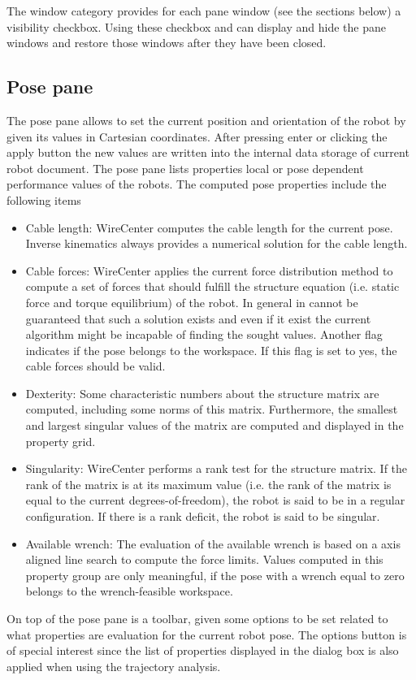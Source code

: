 \documentclass[11pt,a4paper,onepage,openany]{book}
\begin{document}
The window category provides for each pane  window (see the sections below) a
visibility checkbox. Using these checkbox and can display and hide the pane windows
and restore those windows after they have been closed.

\subsection{Pose pane}%
The pose pane allows to set the current position and orientation of the robot
by given its values in Cartesian coordinates. After pressing enter or clicking
the apply button the new values are written into the internal data storage of
current robot document. The pose pane lists properties local or pose dependent
performance values of the robots. The computed pose properties include the
following items
\begin{itemize}
\item Cable length: WireCenter computes the cable length for the current
    pose. Inverse kinematics always provides a numerical solution for the
cable length.

\item Cable forces: WireCenter applies the current force distribution method
    to compute a set of forces that should fulfill the structure equation
    (i.e. static force and torque equilibrium) of the robot. In general in
    cannot be guaranteed that such a solution exists and even if it exist the
    current algorithm might be incapable of finding the sought values.
    Another flag indicates if the pose belongs to the workspace. If this flag
    is set to yes, the cable forces should be valid.

\item Dexterity: Some characteristic numbers about the structure matrix are
    computed, including some norms of this matrix. Furthermore, the smallest
and largest singular values of the matrix are computed and displayed in the
property grid.

\item Singularity: WireCenter performs a rank test for the structure matrix.
    If the rank of the matrix is at its maximum value (i.e. the rank of the
matrix is equal to the current degrees-of-freedom), the robot is said to be
in a regular configuration. If there is a rank deficit, the robot is said to
be singular.

\item Available wrench: The evaluation of the available wrench is based on a
    axis aligned line search to compute the force limits. Values computed in
    this property group are only meaningful, if the pose with a wrench equal
    to zero belongs to the wrench-feasible workspace.
\end{itemize}
On top of the pose pane is a toolbar, given some options to be set related to
what properties are evaluation for the current robot pose. The options button
is of special interest since the list of properties displayed in the dialog box
is also applied when using the trajectory analysis.
\end{document}
